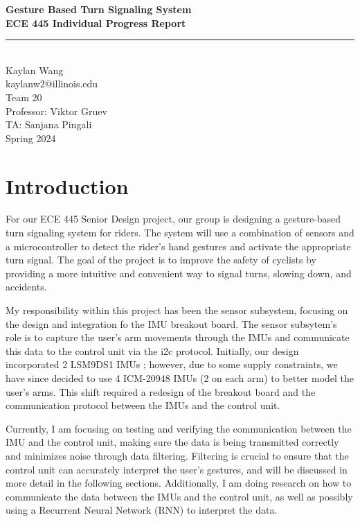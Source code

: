\documentclass[12pt]{article}
\begin{document}
\begin{titlepage}
\centering
{}
{\LARGE\textbf{Gesture Based Turn Signaling System }}\\[1cm] 
{\large\textbf{ECE 445 Individual Progress Report}}\\[0.3cm]
\rule{\textwidth}{1pt}\\
{\Large Kaylan Wang}\\[1cm] 
{\small kaylanw2@illinois.edu}\\[0cm] 
{\small Team 20}\\[0cm]
{\small Professor: Viktor Gruev}\\[0cm]
{\small TA: Sanjana Pingali}\\[0cm]


{\small Spring 2024}\\[0.5cm]

\end{titlepage} 

\newpage
\tableofcontents 
\newpage
\section{Introduction}
For our ECE 445 Senior Design project, our group is designing a gesture-based turn signaling system for riders. The system will use a combination of sensors and a microcontroller to detect the rider's hand gestures and activate the appropriate turn signal. The goal of the project is to improve the safety of cyclists by providing a more intuitive and convenient way to signal turns, slowing down, and accidents. 

My responsibility within this project has been the sensor subsystem, focusing on the design and integration fo the IMU breakout board. The sensor subsytem's role is to capture the user's arm movements through the IMUs and communicate this data to the control unit via the i2c protocol. Initially, our design incorporated 2 LSM9DS1 IMUs \cite{STMicroelectronics2015LSM9DS1}; however, due to some supply constraints, we have since decided to use 4 ICM-20948 IMUs \cite{ICM20948Datasheet} (2 on each arm) to better model the user's arms. This shift required a redesign of the breakout board and the communication protocol between the IMUs and the control unit. 

Currently, I am focusing on testing and verifying the communication between the IMU and the control unit, making sure the data is being transmitted correctly and minimizes noise through data filtering. Filtering is crucial to ensure that the control unit can accurately interpret the user's gestures, and will be discussed in more detail in the following sections. Additionally, I am doing research on how to communicate the data between the IMUs and the control unit, as well as possibly using a Recurrent Neural Network (RNN) to interpret the data.
\end{document}
